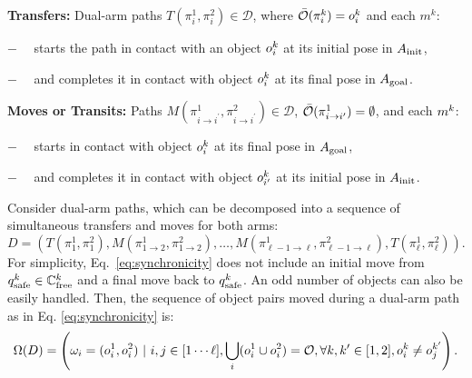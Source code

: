 \noindent\textbf{Transfers:} Dual-arm paths $T(\pi^1_i,\pi^2_i) \in \mathcal{D}$, where $ \bar{\mathcal{O}}(\pi^k_i) =  o^k_i $ and each $m^k$:
\begin{myitem}
\item[$-$]\ \ starts the path in contact with an object $o^k_i$ at its initial pose in $A_{\rm init}$,
\item[$-$]\ \ and completes it in contact with object $ o^k_i $ at its final pose in $A_{\rm goal}$. 
\end{myitem}

\noindent\textbf{Moves or Transits:} Paths $M(\pi^1_{i\rightarrow i^{\prime}},\pi^2_{i\rightarrow i^{\prime}}) \in \mathcal{D}$, $ \bar{\mathcal{O}}(\pi^1_{i\rightarrow i^{\prime}}) = \emptyset $, and each $m^k$:
\begin{myitem}
\item[$-$]\ \  starts in contact with object $o^k_i$ at its final pose in $A_{\rm goal}$,
\item[$-$]\ \  and completes it in contact with object $o^k_{i^{\prime}}$ at its initial pose in $A_{\rm init}$.
\end{myitem}

{\assumption [Synchronicity] Consider dual-arm paths, which can be decomposed into a sequence of simultaneous transfers and moves for both arms:
\begin{equation}
D=\left(T(\pi^1_1,\pi^2_1),M(\pi^1_{1\rightarrow 2},\pi^2_{1\rightarrow 2}), \ldots , M(\pi^1_{\ell-1\rightarrow \ell},\pi^2_{\ell-1\rightarrow \ell}), T(\pi^1_\ell,\pi^2_\ell)\right).
\label{eq:synchronicity}
\end{equation}}
\noindent For simplicity, Eq.~\ref{eq:synchronicity} does not include an initial move from $q^k_{\rm safe} \in \mathbb{C}_{{\rm free}}^k$ and a final move back to $q^k_{\rm safe}$. An odd number of objects can also be easily handled. Then, the sequence of object pairs moved during a dual-arm path as in Eq. \ref{eq:synchronicity} is: 
$$ {{\Omega}}(D) = \left(  {\omega}_i = (o_i^1,o_i^2) \ |\ i,j\in [1\cdots \ell], \bigcup_i (o_i^1 \cup o_i^2) = \mathcal{O}, \forall k,k'\in[1,2], o_i^k \neq o_j^{k'} \right). $$

